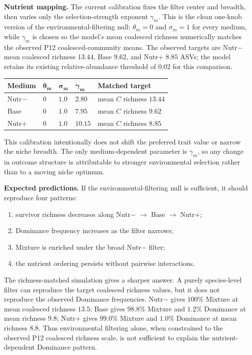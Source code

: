\documentclass[11pt]{article}
\begin{document}
\noindent\textbf{Nutrient mapping.}
The current calibration fixes the filter center and breadth, then varies only the selection-strength exponent $\gamma_m$. This is the clean one-knob version of the environmental-filtering null: $\theta_m=0$ and $\sigma_m=1$ for every medium, while $\gamma_m$ is chosen so the model's mean coalesced richness numerically matches the observed P12 coalesced-community means. The observed targets are Nutr$-$ mean coalesced richness $13.44$, Base $9.62$, and Nutr$+$ $8.85$ ASVs; the model retains its existing relative-abundance threshold of $0.02$ for this comparison.

\begin{center}
\small
\begin{tabular}{p{} p{} p{} p{} p{}}
\toprule
\textbf{Medium} & $\boldsymbol{\theta_m}$ & $\boldsymbol{\sigma_m}$ & $\boldsymbol{\gamma_m}$ & \textbf{Matched target} \\
\midrule
Nutr$-$ & $0$ & $1.0$ & $2.80$ & mean $C$ richness $13.44$ \\
Base & $0$ & $1.0$ & $7.95$ & mean $C$ richness $9.62$ \\
Nutr$+$ & $0$ & $1.0$ & $10.15$ & mean $C$ richness $8.85$ \\
\bottomrule
\end{tabular}
\end{center}

\noindent This calibration intentionally does not shift the preferred trait value or narrow the niche breadth. The only medium-dependent parameter is $\gamma_m$, so any change in outcome structure is attributable to stronger environmental selection rather than to a moving niche optimum.

\noindent\textbf{Expected predictions.}
If the environmental-filtering null is sufficient, it should reproduce four patterns:

\begin{enumerate}[itemsep=2pt]
    \item survivor richness decreases along Nutr$-$ $\to$ Base $\to$ Nutr$+$;
    \item Dominance frequency increases as the filter narrows;
    \item Mixture is enriched under the broad Nutr$-$ filter;
    \item the nutrient ordering persists without pairwise interactions.
\end{enumerate}

\noindent The richness-matched simulation gives a sharper answer. A purely species-level filter can reproduce the target coalesced richness values, but it does not reproduce the observed Dominance frequencies. Nutr$-$ gives $100\%$ Mixture at mean coalesced richness $13.5$; Base gives $98.8\%$ Mixture and $1.2\%$ Dominance at mean richness $9.8$; Nutr$+$ gives $99.0\%$ Mixture and $1.0\%$ Dominance at mean richness $8.8$. Thus environmental filtering alone, when constrained to the observed P12 coalesced richness scale, is not sufficient to explain the nutrient-dependent Dominance pattern.
\end{document}

